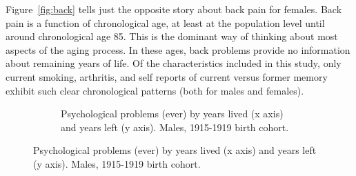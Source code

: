 \documentclass[11pt,oneside]{article} %
\begin{document}
Figure~\ref{fig:back} tells just the opposite story about back pain for females.
Back pain is a function of
chronological age, at least at the population level until around chronological
age 85. This is the dominant way of thinking about most aspects of the aging
process. In these ages, back problems provide no information about remaining
years of life. Of the characteristics included in this
study, only current smoking, arthritis, and self reports of current versus former memory exhibit such clear chronological patterns (both for males and
females).

\begin{figure}[!h]
    \centering
    \caption{Examples of characteristics that vary along the thanatological and
    chronological age axes.}
    \label{fig:thanochrono}
    \begin{subfigure}{\linewidth}
    \caption{Psychological problems (ever) by
    years lived (x axis) and years left (y axis). Males, 1915-1919 birth cohort.
    }
    \label{fig:psych}
	\vspace{-2em}
	\end{subfigure}
	

\end{figure}
\end{document}
